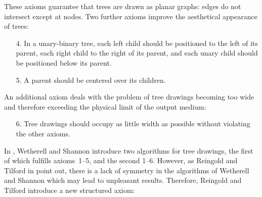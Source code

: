 These axioms guarantee that trees are drawn as planar graphs: edges do          
not intersect except at nodes. Two further axioms improve the aesthetical       
appearance of trees:                                                            
                                                                                
\begin{enumerate}                                                               
\item[4.] In a unary-binary tree, each left child should be positioned          
          to the left of its parent, each                                       
          right child to the right of its parent, and each unary child          
          should be positioned below its parent.                                
\item[5.] A parent should be centered over its children.                        
\end{enumerate}                                                                 
                                                                                
An additional axiom deals with the problem of tree drawings becoming too wide   
and therefore exceeding the physical limit of the output medium:                
                                                                                
\begin{enumerate}                                                               
\item[6.] Tree drawings should occupy as little width as possible without       
          violating the other axioms.                                           
\end{enumerate}                                                                 
                                                                                
In \cite{TidyTrees}, Wetherell and Shannon introduce two algorithms for         
tree drawings, the first of which fulfills axioms~1--5, and the second          
1--6. However, as Reingold and Tilford in \cite{TidierTrees}                    
point out, there is a lack of symmetry in the algorithms of                     
Wetherell and Shannon which may lead to unpleasant results.
Therefore, Reingold and Tilford introduce a new structured        
axiom:                                                                          
                                                                                
